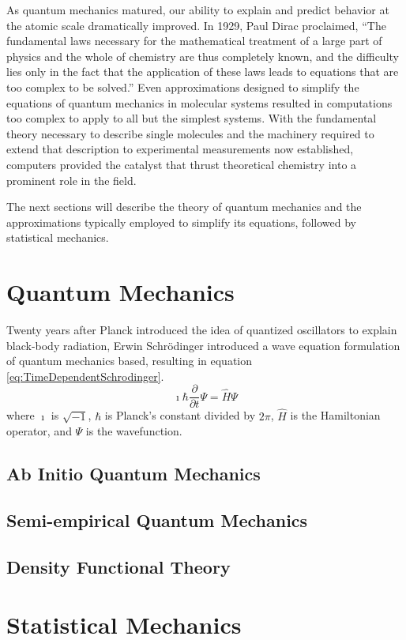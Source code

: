 As quantum mechanics matured, our ability to explain and predict behavior at the
atomic scale dramatically improved. In 1929, Paul Dirac proclaimed, ``The
fundamental laws necessary for the mathematical treatment of a large part of
physics and the whole of chemistry are thus completely known, and the difficulty
lies only in the fact that the application of these laws leads to equations that
are too complex to be solved.'' Even approximations designed to simplify the
equations of quantum mechanics in molecular systems resulted in computations too
complex to apply to all but the simplest systems. With the fundamental theory
necessary to describe single molecules and the machinery required to extend
that description to experimental measurements now established, computers
provided the catalyst that thrust theoretical chemistry into a prominent role in
the field.

The next sections will describe the theory of quantum mechanics and the
approximations typically employed to simplify its equations, followed by
statistical mechanics.

\section{Quantum Mechanics}
Twenty years after Planck introduced the idea of quantized oscillators to
explain black-body radiation, Erwin Schr\"{o}dinger introduced a wave equation
formulation of quantum mechanics based, resulting in equation
\ref{eq:TimeDependentSchrodinger}. \cite{Schrodinger1926}
\begin{equation}
   \imath \hbar \frac {\partial} {\partial t} \Psi = \hat{H} \Psi
   \label{eq:TimeDependentSchrodinger}
\end{equation}
where $\imath$ is $\sqrt {-1}$, $\hbar$ is Planck's constant divided by $2 \pi$,
$\hat H$ is the Hamiltonian operator, and $\Psi$ is the wavefunction.

\subsection{Ab Initio Quantum Mechanics}

\subsection{Semi-empirical Quantum Mechanics}

\subsection{Density Functional Theory}

\section{Statistical Mechanics}

